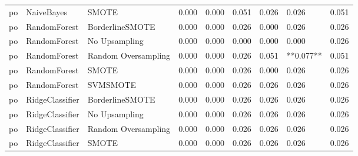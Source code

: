 \begin{tabular}{lllllllll}
      po &                      NaiveBayes &                         SMOTE &     0.000 &                     0.000 &                 0.051 &                  0.026 &                                   0.026 &     0.051 \\
      po &                    RandomForest &               BorderlineSMOTE &     0.000 &                     0.000 &                 0.026 &                  0.000 &                                   0.026 &     0.026 \\
      po &                    RandomForest &                 No Upsampling &     0.000 &                     0.000 &                 0.000 &                  0.000 &                                   0.000 &     0.026 \\
      po &                    RandomForest &           Random Oversampling &     0.000 &                     0.000 &                 0.026 &                  0.051 &                               **0.077** &     0.051 \\
      po &                    RandomForest &                         SMOTE &     0.000 &                     0.000 &                 0.026 &                  0.000 &                                   0.026 &     0.026 \\
      po &                    RandomForest &                      SVMSMOTE &     0.000 &                     0.000 &                 0.026 &                  0.026 &                                   0.026 &     0.026 \\
      po &                 RidgeClassifier &               BorderlineSMOTE &     0.000 &                     0.000 &                 0.026 &                  0.026 &                                   0.026 &     0.026 \\
      po &                 RidgeClassifier &                 No Upsampling &     0.000 &                     0.000 &                 0.026 &                  0.026 &                                   0.026 &     0.026 \\
      po &                 RidgeClassifier &           Random Oversampling &     0.000 &                     0.000 &                 0.026 &                  0.026 &                                   0.026 &     0.026 \\
      po &                 RidgeClassifier &                         SMOTE &     0.000 &                     0.000 &                 0.026 &                  0.026 &                                   0.026 &     0.026 \\

\end{tabular}
